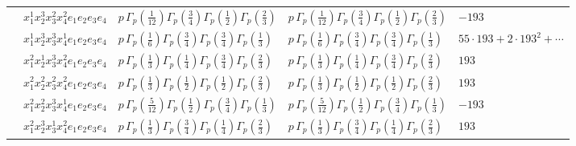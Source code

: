 \documentclass[11pt]{article}
\begin{document}
\begin{table}[ht]
{\begin{tabular}{@{}lllll@{}}
 & $x_{1}^{1} x_{2}^{3} x_{3}^{2} x_{4}^{2}  e_{1} e_{2} e_{3} e_{4}$ & $p \, \Gamma_p \left( \frac{1}{12} \right) \Gamma_p \left( \frac{3}{4} \right) \Gamma_p \left( \frac{1}{2} \right) \Gamma_p \left( \frac{2}{3} \right)$ & $p \, \Gamma_p \left( \frac{1}{12} \right) \Gamma_p \left( \frac{3}{4} \right) \Gamma_p \left( \frac{1}{2} \right) \Gamma_p \left( \frac{2}{3} \right)$ & $-193$ \\
 & $x_{1}^{1} x_{2}^{3} x_{3}^{3} x_{4}^{1}  e_{1} e_{2} e_{3} e_{4}$ & $p \, \Gamma_p \left( \frac{1}{6} \right) \Gamma_p \left( \frac{3}{4} \right) \Gamma_p \left( \frac{3}{4} \right) \Gamma_p \left( \frac{1}{3} \right)$ & $p \, \Gamma_p \left( \frac{1}{6} \right) \Gamma_p \left( \frac{3}{4} \right) \Gamma_p \left( \frac{3}{4} \right) \Gamma_p \left( \frac{1}{3} \right)$ & $55{\cdot}193{+}2{\cdot}193^{2}{+}\cdots$ \\
 & $x_{1}^{2} x_{2}^{1} x_{3}^{3} x_{4}^{2}  e_{1} e_{2} e_{3} e_{4}$ & $p \, \Gamma_p \left( \frac{1}{3} \right) \Gamma_p \left( \frac{1}{4} \right) \Gamma_p \left( \frac{3}{4} \right) \Gamma_p \left( \frac{2}{3} \right)$ & $p \, \Gamma_p \left( \frac{1}{3} \right) \Gamma_p \left( \frac{1}{4} \right) \Gamma_p \left( \frac{3}{4} \right) \Gamma_p \left( \frac{2}{3} \right)$ & $193$ \\
 & $x_{1}^{2} x_{2}^{2} x_{3}^{2} x_{4}^{2}  e_{1} e_{2} e_{3} e_{4}$ & $p \, \Gamma_p \left( \frac{1}{3} \right) \Gamma_p \left( \frac{1}{2} \right) \Gamma_p \left( \frac{1}{2} \right) \Gamma_p \left( \frac{2}{3} \right)$ & $p \, \Gamma_p \left( \frac{1}{3} \right) \Gamma_p \left( \frac{1}{2} \right) \Gamma_p \left( \frac{1}{2} \right) \Gamma_p \left( \frac{2}{3} \right)$ & $193$ \\
 & $x_{1}^{2} x_{2}^{2} x_{3}^{3} x_{4}^{1}  e_{1} e_{2} e_{3} e_{4}$ & $p \, \Gamma_p \left( \frac{5}{12} \right) \Gamma_p \left( \frac{1}{2} \right) \Gamma_p \left( \frac{3}{4} \right) \Gamma_p \left( \frac{1}{3} \right)$ & $p \, \Gamma_p \left( \frac{5}{12} \right) \Gamma_p \left( \frac{1}{2} \right) \Gamma_p \left( \frac{3}{4} \right) \Gamma_p \left( \frac{1}{3} \right)$ & $-193$ \\
 & $x_{1}^{2} x_{2}^{3} x_{3}^{1} x_{4}^{2}  e_{1} e_{2} e_{3} e_{4}$ & $p \, \Gamma_p \left( \frac{1}{3} \right) \Gamma_p \left( \frac{3}{4} \right) \Gamma_p \left( \frac{1}{4} \right) \Gamma_p \left( \frac{2}{3} \right)$ & $p \, \Gamma_p \left( \frac{1}{3} \right) \Gamma_p \left( \frac{3}{4} \right) \Gamma_p \left( \frac{1}{4} \right) \Gamma_p \left( \frac{2}{3} \right)$ & $193$ \\

\end{tabular}}
\end{table}
\end{document}
